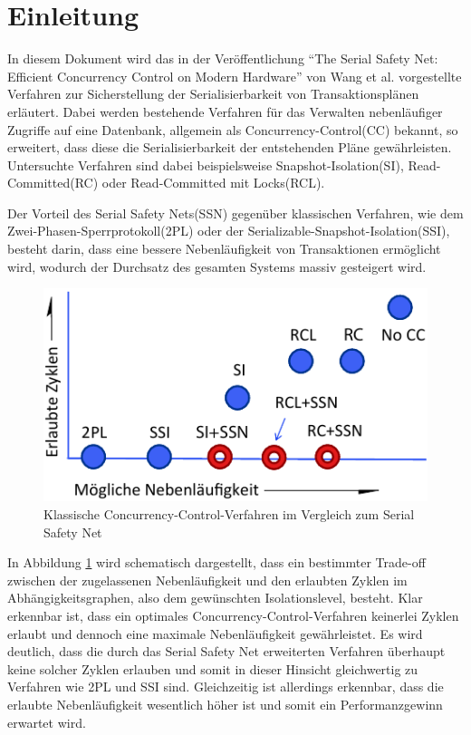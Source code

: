 \section{Einleitung}
\label{sec:einleitung}

In diesem Dokument wird das in der Veröffentlichung \enquote{The Serial Safety Net: Efficient Concurrency Control on Modern Hardware} von Wang et al. \cite{Wang:2015} vorgestellte Verfahren zur Sicherstellung der Serialisierbarkeit von Transaktionsplänen erläutert.
Dabei werden bestehende Verfahren für das Verwalten nebenläufiger Zugriffe auf eine Datenbank, allgemein als Concurrency-Control(CC) bekannt, so erweitert, dass diese die Serialisierbarkeit der entstehenden Pläne gewährleisten.
Untersuchte Verfahren sind dabei beispielsweise Snapshot-Isolation(SI), Read-Committed(RC) oder Read-Committed mit Locks(RCL).

Der Vorteil des Serial Safety Nets(SSN) gegenüber klassischen Verfahren, wie dem Zwei-Phasen-Sperrprotokoll(2PL) oder der Serializable-Snapshot-Isolation(SSI), besteht darin, dass eine bessere Nebenläufigkeit von Transaktionen ermöglicht wird, wodurch der Durchsatz des gesamten Systems massiv gesteigert wird.

\begin{figure}
	\includegraphics{img/Figure_1_komplett.pdf}
	\caption{Klassische Concurrency-Control-Verfahren im Vergleich zum Serial Safety Net}
	\label{fig:trade_off}
\end{figure}

In Abbildung \ref{fig:trade_off} wird schematisch dargestellt, dass ein bestimmter Trade-off zwischen der zugelassenen Nebenläufigkeit und den erlaubten Zyklen im Abhängigkeitsgraphen, also dem gewünschten Isolationslevel, besteht.
Klar erkennbar ist, dass ein optimales Concurrency-Control-Verfahren keinerlei Zyklen erlaubt und dennoch eine maximale Nebenläufigkeit gewährleistet.
Es wird deutlich, dass die durch das Serial Safety Net erweiterten Verfahren überhaupt keine solcher Zyklen erlauben und somit in dieser Hinsicht gleichwertig zu Verfahren wie 2PL und SSI sind.
Gleichzeitig ist allerdings erkennbar, dass die erlaubte Nebenläufigkeit wesentlich höher ist und somit ein Performanzgewinn erwartet wird.

